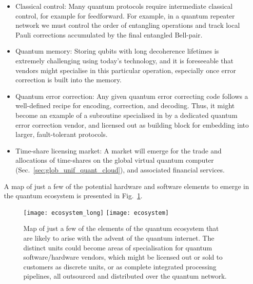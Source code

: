 \begin{itemize}
\item Classical control: Many quantum protocols require intermediate classical control, for example for feedforward. For example, in a quantum repeater network we must control the order of entangling operations and track local Pauli corrections accumulated by the final entangled Bell-pair.

\item Quantum memory: Storing qubits with long decoherence lifetimes is extremely challenging using today's technology, and it is foreseeable that vendors might specialise in this particular operation, especially once error correction is built into the memory. 

\item Quantum error correction: Any given quantum error correcting code follows a well-defined recipe for encoding, correction, and decoding. Thus, it might become an example of a subroutine specialised in by a dedicated quantum error correction vendor, and licensed out as building block for embedding into larger, fault-tolerant protocols.

\item Time-share licensing market: A market will emerge for the trade and allocations of time-shares on the global virtual quantum computer (Sec.~\ref{sec:glob_unif_quant_cloud}), and associated financial services.
\end{itemize}

A map of just a few of the potential hardware and software elements to emerge in the quantum ecosystem is presented in Fig.~\ref{fig:ecosystem}.

\begin{figure}[!htpb]
\pubmode
\texttt{[image: ecosystem\_long]}
\else
\texttt{[image: ecosystem]}
\fi
\caption{Map of just a few of the elements of the quantum ecosystem that are likely to arise with the advent of the quantum internet. The distinct units could become areas of specialisation for quantum software/hardware vendors, which might be licensed out or sold to customers as discrete units, or as complete integrated processing pipelines, all outsourced and distributed over the quantum network.}\label{fig:ecosystem}	
\end{figure}